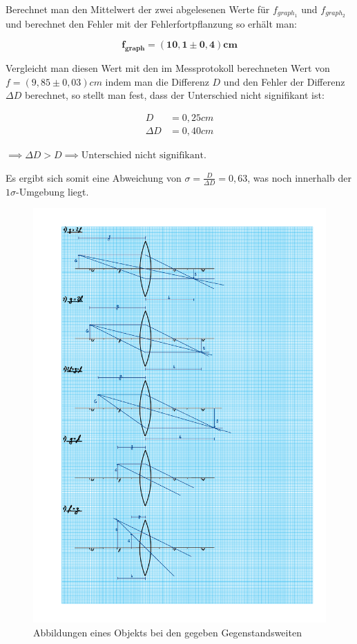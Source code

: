 \documentclass{article}
\begin{document}
Berechnet man den Mittelwert der zwei abgelesenen Werte für $f_{graph_{1}}$ und $f_{graph_{2}}$ und berechnet den Fehler mit der Fehlerfortpflanzung so erhält man:

\begin{equation}
    \bm{f_{graph} = (10,1 \pm 0,4)cm}
\end{equation}

Vergleicht man diesen Wert mit den im Messprotokoll berechneten Wert von $f=(9,85 \pm 0,03)cm$ indem man die Differenz $D$ und den Fehler der Differenz $\Delta D$ berechnet, so stellt man fest, dass der Unterschied nicht signifikant ist:

\begin{equation}
    \begin{split}
        D &= 0,25cm \\
        \Delta D &= 0,40cm
    \end{split}
\end{equation}

$\implies \Delta D > D \implies \text{Unterschied nicht signifikant.}$

Es ergibt sich somit eine Abweichung von $\sigma = \frac{D}{\Delta D} = 0,63$, was noch innerhalb der $1\sigma$-Umgebung liegt.

\begin{figure} [p]
    \centering
    \includegraphics[width=\textwidth]{graphics/dia1.pdf}
    \caption{Abbildungen eines Objekts bei den gegeben Gegenstandsweiten}
\end{figure}
\end{document}
